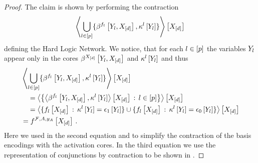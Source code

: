 \begin{proof}
    The claim is shown by performing the contraction
    \begin{align*}
        \left\langle 
            \bigcup_{l\in[p]}\{\beta^{f_{l}}\left[Y_{l},X_{[d]}\right],\kappa^{l}\left[Y_{l}\right]\}
        \right\rangle \left[ X_{[d]} \right]
    \end{align*}
    defining the Hard Logic Network.
    We notice, that for each $l\in[p]$ the variables $Y_{l}$ appear only in the cores $\beta^{X_{[d]}}\left[Y_{l},X_{[d]}\right]$ and $\kappa^{l}\left[Y_{l}\right]$ and thus
    \begin{align*}
        & \left\langle 
            \bigcup_{l\in[p]}\{\beta^{f_{l}}\left[Y_{l},X_{[d]}\right],\kappa^{l}\left[Y_{l}\right]\}
        \right\rangle \left[ X_{[d]} \right] \\
        & \quad =    \left\langle 
            \left\{
            \left\langle \beta^{f_{l}}\left[Y_{l},X_{[d]}\right],\kappa^{l}\left[Y_{l}\right]\right\rangle \left[ X_{[d]} \right]
            \,:\,l\in[p]\right\}
        \right\rangle \left[ X_{[d]} \right] \\
        & \quad = \left\langle 
            \{
            f_{l}\left[X_{[d]}\right]
            \,:\,\kappa^{l}\left[Y_{l}\right] = \epsilon_1\left[Y_{l}\right]
            \}
            \cup
            \{
            f_{l}\left[X_{[d]}\right]
            \,:\,\kappa^{l}\left[Y_{l}\right] = \epsilon_0\left[Y_{l}\right]
            \}
        \right\rangle \left[ X_{[d]} \right] \\
        & = f^{\mathcal{F},A,y_{A}}\left[X_{[d]}\right] \, .
    \end{align*}
    Here we used in the second equation  and  to simplify the contraction of the basis encodings with the activation cores.
    In the third equation we use the representation of conjunctions by contraction to be shown in .
\end{proof}

